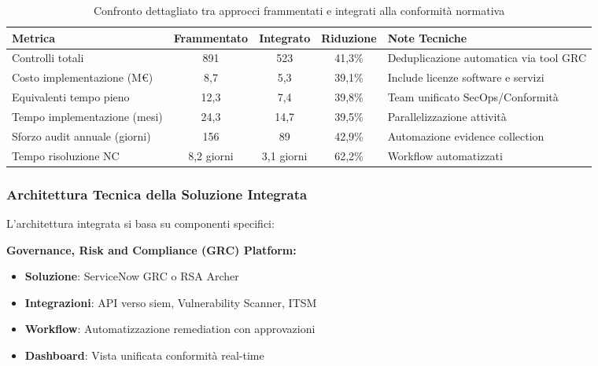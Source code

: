 \begin{table}[h]
\centering
\caption{Confronto dettagliato tra approcci frammentati e integrati alla conformità normativa}
\label{tab:confronto_compliance}
\begin{tabular}{|l|c|c|c|p{4cm}|}
\hline
\textbf{Metrica} & \textbf{Frammentato} & \textbf{Integrato} & \textbf{Riduzione} & \textbf{Note Tecniche} \\
\hline
Controlli totali & 891 & 523 & 41,3\% & Deduplicazione automatica via tool GRC \\
Costo implementazione (M€) & 8,7 & 5,3 & 39,1\% & Include licenze software e servizi \\
Equivalenti tempo pieno & 12,3 & 7,4 & 39,8\% & Team unificato SecOps/Conformità \\
Tempo implementazione (mesi) & 24,3 & 14,7 & 39,5\% & Parallelizzazione attività \\
Sforzo audit annuale (giorni) & 156 & 89 & 42,9\% & Automazione evidence collection \\
Tempo risoluzione NC & 8,2 giorni & 3,1 giorni & 62,2\% & Workflow automatizzati \\
\hline
\end{tabular}
\end{table}

\subsubsection{Architettura Tecnica della Soluzione Integrata}

L'architettura integrata si basa su componenti specifici:

\textbf{Governance, Risk and Compliance (GRC) Platform:}
\begin{itemize}
    \item \textbf{Soluzione}: ServiceNow GRC o RSA Archer
    \item \textbf{Integrazioni}: API verso \gls{siem}, Vulnerability Scanner, ITSM
    \item \textbf{Workflow}: Automatizzazione remediation con approvazioni
    \item \textbf{Dashboard}: Vista unificata conformità real-time
\end{itemize}

